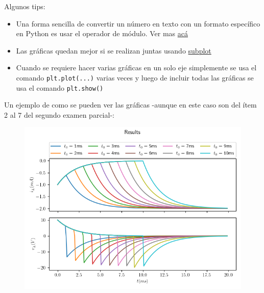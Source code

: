 \documentclass[12pt]{article}
\begin{document}
Algunos tips:
\begin{itemize}
    \item Una forma sencilla de convertir un número en texto con un formato específico en Python es usar el operador de módulo. Ver mas \href{https://realpython.com/python-input-output/#the-string-modulo-operator}{acá}
    \item Las gráficas quedan mejor si se realizan juntas usando \href{https://matplotlib.org/3.1.1/api/_as_gen/matplotlib.pyplot.subplots.html}{subplot} 
    \item Cuando se requiere hacer varias gráficas en un solo eje simplemente se usa el comando \verb|plt.plot(...)| varias veces y luego de incluir todas las gráficas se usa el comando \verb|plt.show()|
\end{itemize}

Un ejemplo de como se pueden ver las gráficas -aunque en este caso son del ítem 2 al 7 del segundo examen parcial-:

\begin{figure}[H]
    \centering
    \includegraphics[width=0.9\linewidth]{fig/EP2_P1.png}
\end{figure}


% 
% 
\end{document}
